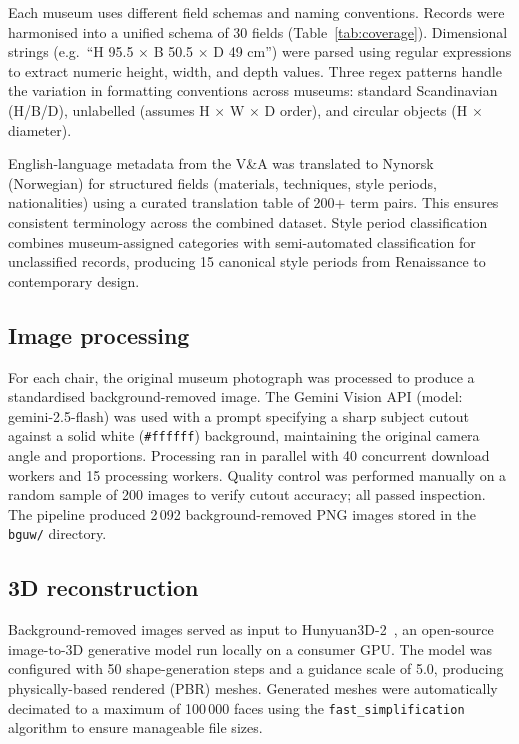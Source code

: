 Each museum uses different field schemas and naming conventions.
Records were harmonised into a unified schema of 30 fields (Table~\ref{tab:coverage}).
Dimensional strings (e.g.\ ``H 95.5 $\times$ B 50.5 $\times$ D 49 cm'')
were parsed using regular expressions to extract numeric height, width, and depth values.
Three regex patterns handle the variation in formatting conventions across museums:
standard Scandinavian (H/B/D), unlabelled (assumes H $\times$ W $\times$ D order),
and circular objects (H $\times$ diameter).

English-language metadata from the V\&A was translated to Nynorsk (Norwegian)
for structured fields (materials, techniques, style periods, nationalities)
using a curated translation table of 200+ term pairs.
This ensures consistent terminology across the combined dataset.
Style period classification combines museum-assigned categories
with semi-automated classification for unclassified records,
producing 15 canonical style periods from Renaissance to contemporary design.

\subsection{Image processing}

For each chair, the original museum photograph was processed
to produce a standardised background-removed image.
The Gemini Vision API (model: gemini-2.5-flash) was used with a prompt specifying
a sharp subject cutout against a solid white (\texttt{\#ffffff}) background,
maintaining the original camera angle and proportions.
Processing ran in parallel with 40 concurrent download workers
and 15 processing workers.
Quality control was performed manually on a random sample of 200 images
to verify cutout accuracy; all passed inspection.
The pipeline produced 2\,092 background-removed PNG images
stored in the \texttt{bguw/} directory.

\subsection{3D reconstruction}

Background-removed images served as input to Hunyuan3D-2~\cite{hunyuan3d},
an open-source image-to-3D generative model run locally on a consumer GPU.
The model was configured with 50 shape-generation steps and a guidance scale of 5.0,
producing physically-based rendered (PBR) meshes.
Generated meshes were automatically decimated to a maximum of 100\,000 faces
using the \texttt{fast\_simplification} algorithm to ensure manageable file sizes.


